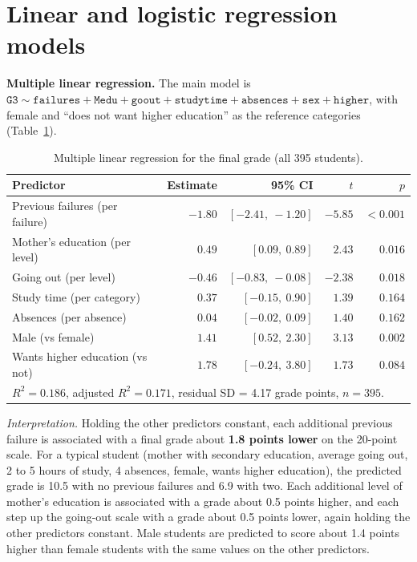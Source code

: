 \documentclass[11pt,a4paper]{article}
\begin{document}
\section{Linear and logistic regression models}

\textbf{Multiple linear regression.} The main model is
$\texttt{G3} \sim \texttt{failures} + \texttt{Medu} + \texttt{goout} + \texttt{studytime} + \texttt{absences} + \texttt{sex} + \texttt{higher}$,
with female and ``does not want higher education'' as the reference categories (Table~\ref{tab:lin}).

\begin{table}[H]
\centering\small
\caption{Multiple linear regression for the final grade (all 395 students).}
\label{tab:lin}
\begin{tabular}{lrrrr}
\toprule
Predictor & Estimate & 95\% CI & $t$ & $p$ \\
\midrule
Previous failures (per failure) & $-1.80$ & $[-2.41,\ -1.20]$ & $-5.85$ & $<0.001$ \\
Mother's education (per level) & $0.49$ & $[0.09,\ 0.89]$ & $2.43$ & $0.016$ \\
Going out (per level) & $-0.46$ & $[-0.83,\ -0.08]$ & $-2.38$ & $0.018$ \\
Study time (per category) & $0.37$ & $[-0.15,\ 0.90]$ & $1.39$ & $0.164$ \\
Absences (per absence) & $0.04$ & $[-0.02,\ 0.09]$ & $1.40$ & $0.162$ \\
Male (vs female) & $1.41$ & $[0.52,\ 2.30]$ & $3.13$ & $0.002$ \\
Wants higher education (vs not) & $1.78$ & $[-0.24,\ 3.80]$ & $1.73$ & $0.084$ \\
\midrule
\multicolumn{5}{l}{$R^2 = 0.186$, adjusted $R^2 = 0.171$, residual SD = 4.17 grade points, $n = 395$.}\\
\bottomrule
\end{tabular}
\end{table}

\emph{Interpretation.} Holding the other predictors constant, each additional previous failure is associated with a final grade about \textbf{1.8 points lower} on the 20-point scale. For a typical student (mother with secondary education, average going out, 2 to 5 hours of study, 4 absences, female, wants higher education), the predicted grade is 10.5 with no previous failures and 6.9 with two. Each additional level of mother's education is associated with a grade about 0.5 points higher, and each step up the going-out scale with a grade about 0.5 points lower, again holding the other predictors constant. Male students are predicted to score about 1.4 points higher than female students with the same values on the other predictors.
\end{document}
